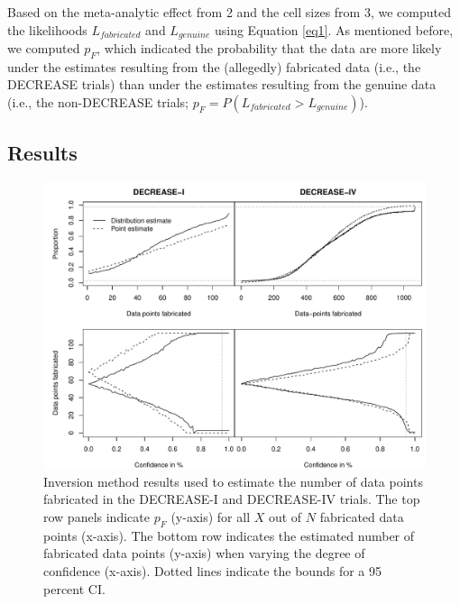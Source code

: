 \documentclass[]{article}
\begin{document}
Based on the meta-analytic effect from 2 and the cell sizes from 3, we
computed the likelihoods \(L_{fabricated}\) and \(L_{genuine}\) using
Equation \ref{eq1}. As mentioned before, we computed \(p_F\), which
indicated the probability that the data are more likely under the
estimates resulting from the (allegedly) fabricated data (i.e., the
DECREASE trials) than under the estimates resulting from the genuine
data (i.e., the non-DECREASE trials;
\(p_F=P(L_{fabricated}>L_{genuine})\)).

\subsection{Results}\label{results-2}

\begin{figure}

{\centering \includegraphics[width=0.8\linewidth]{../figures/fig3} 

}

\caption{Inversion method results used to estimate the number of data points fabricated in the DECREASE-I and DECREASE-IV trials. The top row panels indicate $p_F$ (y-axis) for all $X$ out of $N$ fabricated data points (x-axis). The bottom row indicates the estimated number of fabricated data points (y-axis) when varying the degree of confidence (x-axis). Dotted lines indicate the bounds for a 95 percent CI.}\label{fig:figure 3}
\end{figure}
\end{document}
